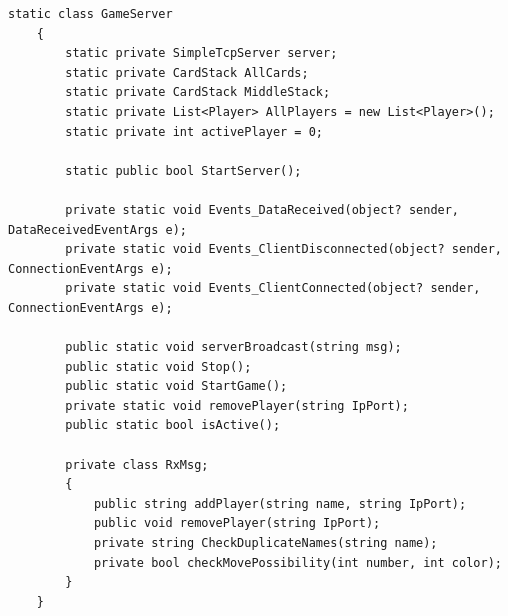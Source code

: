 \begin{lstlisting}[label={code:gameserver}, caption={Klasse \textit{GameServer}}]
	static class GameServer
	{
		static private SimpleTcpServer server;
		static private CardStack AllCards;
		static private CardStack MiddleStack;
		static private List<Player> AllPlayers = new List<Player>();
		static private int activePlayer = 0;
		
		static public bool StartServer();
		
		private static void Events_DataReceived(object? sender, DataReceivedEventArgs e);
		private static void Events_ClientDisconnected(object? sender, ConnectionEventArgs e);
		private static void Events_ClientConnected(object? sender, ConnectionEventArgs e);
		
		public static void serverBroadcast(string msg);
		public static void Stop();
		public static void StartGame();
		private static void removePlayer(string IpPort);
		public static bool isActive();
		
		private class RxMsg;
		{
			public string addPlayer(string name, string IpPort);
			public void removePlayer(string IpPort);
			private string CheckDuplicateNames(string name);
			private bool checkMovePossibility(int number, int color);
		}
	}
\end{lstlisting}
